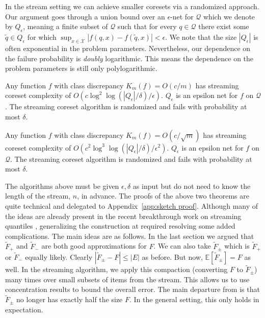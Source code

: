 \documentclass[anon,12pt]{colt2019} %
\newcommand{\E}{\mathbb{E}}
\newcommand{\eps}{\epsilon}
\newcommand{\F}{\mathcal{F}}
\newcommand{\X}{\mathcal{X}}
\newcommand{\Q}{\mathcal{Q}}
\begin{document}
\noindent In the stream setting we can achieve smaller coresets via a randomized approach. 
Our argument goes through a union bound over an $\eps$-net for $\Q$ which we denote by $Q_\eps$, meaning a finite subset of $\Q$ such that for every $q \in \Q$ there exist some $\tilde{q} \in Q_\eps$ for which $\sup_{x \in \X} |f(q,x) - f(\tilde{q},x)| < \eps$. 
We note that the size $|Q_\eps|$ is often exponential in the problem parameters. 
Nevertheless, our dependence on the failure probability is \emph{doubly} logarithmic. 
This means the dependence on the problem parameters is still only polylogarithmic.

\begin{theorem} \label{thm:streaming12}
Any function $f$ with class discrepancy $K_m(f) = O(c/m)$ has streaming coreset complexity of $O\left(c\log^2\log(|Q_\eps|/\delta)/\eps\right)$.
$Q_\eps$ is an epsilon net for $f$ on $\Q$. 
The streaming coreset algorithm is randomized and fails with probability at most $\delta$.
\end{theorem}

\begin{theorem} \label{thm:streaming22}
Any function $f$ with class discrepancy $K_m(f) = O(c/\sqrt{m})$ has streaming coreset complexity of $O\left(c^2\log^3\log(|Q_\eps|/\delta) /\eps^2\right)$.
$Q_\eps$ is an epsilon net for $f$ on $\Q$. 
The streaming coreset algorithm is randomized and fails with probability at most $\delta$.
\end{theorem}


The algorithms above must be given $\eps, \delta$ as input but do not need to know the length of the stream, $n$, in advance. 
The proofs of the above two theorems are quite technical and delegated to Appendix~\ref{app:sketch proof}. Although many of the ideas are already present in the recent breakthrough work on streaming quantiles \cite{DBLP:conf/focs/KarninLL16}, generalizing the construction at  \cite{DBLP:conf/focs/KarninLL16} required resolving some added complications. The main ideas are as follows. 
In the last section we argued that $\tilde F_{+}$ and $\tilde F_{-}$ are both good approximations for $F$. 
We can also take $\tilde F_{\pm}$ which is $\tilde F_{+}$ or $\tilde F_{-}$ equally likely. 
Clearly $|\tilde F_{\pm} - F| \le |E|$ as before. But now, $\E[\tilde F_{\pm}] = F$ as well. 
In the streaming algorithm, we apply this compaction (converting $F$ to $\tilde F_{\pm}$) many times over small subsets of items from the stream. This allows us to use concentration results to bound the overall error. The main departure from \cite{DBLP:conf/focs/KarninLL16} is that $\tilde F_{\pm}$ no longer has exactly half the size $F$. In the general setting, this only holds in expectation.
\end{document}
